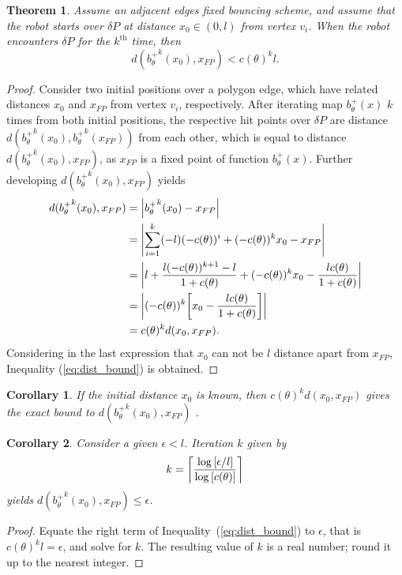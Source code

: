 \documentclass[10pt,a4paper]{article}
\DeclarePairedDelimiter{\ceil}{\lceil}{\rceil}
\newtheorem{theorem}{\bf Theorem}
\newtheorem{corollary}{\bf Corollary}
\begin{document}
\begin{theorem} \label{Proposition:distanceFromFP}
Assume an adjacent edges fixed bouncing scheme, and assume that the robot starts over $\delta P$ at distance $x_0 \in (0,l)$ from vertex $v_i$. When the robot encounters $\delta P$ for the $k^{\text{th}}$ time, then 
\begin{equation} \label{eq:dist_bound}
d({b^+_{\theta}}^{k}(x_0),x_{FP}) < c(\theta)^{k} l.
\end{equation}
\end{theorem}
\begin{proof}
Consider two initial positions over a polygon edge, which have related distances $x_0$ and $x_{FP}$ from vertex $v_i$, respectively. After iterating map $b^+_{\theta}(x)$ $k$ times from both initial positions, the respective hit points over $\delta P$ are distance $d({b^+_{\theta}}^{k}(x_0),{b^+_{\theta}}^{k}(x_{FP}))$ from each other, which is equal to distance $d({b^+_{\theta}}^{k}(x_0),x_{FP})$, as $x_{FP}$ is a fixed point of function $b^+_{\theta}(x)$. Further developing $d({b^+_{\theta}}^{k}(x_0),x_{FP})$ yields 
\begin{align*}
d({b^+_{\theta}}^{k}(x_0),x_{FP}) & = \abs{{b^+_{\theta}}^{k}(x_0) - x_{FP} }\\
	 & = \abs{ \sum_{i=1}^{k} (-l) (-c(\theta))^i + (-c(\theta))^kx_0  - x_{FP} } \\
	 & = \abs{ l +\frac{l(-c(\theta))^{k+1}-l}{1+c(\theta)} + (-c(\theta))^{k}x_0  - \frac{lc(\theta)}{1+c(\theta)} } \\
     & = \abs{(-c(\theta))^{k} \bigg[ x_0 - \frac{l c(\theta) }{ 1 + c(\theta) } \bigg] }\\
     & = c(\theta)^{k} d(x_0,x_{FP}).
\end{align*}
Considering in the last expression that $x_0$ can not be $l$ distance apart from $x_{FP}$, Inequality (\ref{eq:dist_bound}) is obtained.
\end{proof}

\begin{corollary} \label{rm1}
If the initial distance $x_0$ is known, then $c(\theta)^{k} d(x_0,x_{FP})$ gives the exact bound to $d({b^+_{\theta}}^{k}(x_0),x_{FP})$ .
\end{corollary}

\begin{corollary} \label{Lemma:iteration}
Consider a given $\epsilon  < l$. Iteration $k$ given by 
\begin{equation}
k = \ceil[\bigg]{ \frac{ \log \left[ \epsilon / l \right]   }{ \log \left[  c(\theta) \right] }  } 
\end{equation}
yields $d({b^+_{\theta}}^{k}(x_0),x_{FP}) \leq \epsilon$.
\end{corollary}
\begin{proof}
Equate the right term of Inequality~(\ref{eq:dist_bound}) to $\epsilon$, that is $c(\theta)^{k} l = \epsilon$, and solve for $k$. The resulting value of $k$ is a real number; round it up to the nearest integer. 
\end{proof}
\end{document}
